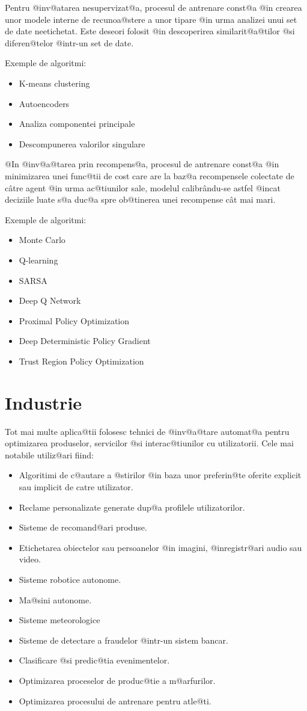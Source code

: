 Pentru @inv@atarea nesupervizat@a, procesul de antrenare const@a @in crearea unor modele interne de recunoa@stere a unor tipare @in urma analizei unui set de date neetichetat. Este deseori folosit @in descoperirea similarit@a@tilor @si diferen@telor @intr-un set de date.

Exemple de algoritmi:
\begin{itemize}
	\item K-means clustering
	\item Autoencoders
	\item Analiza componentei principale
	\item Descompunerea valorilor singulare
\end{itemize}

@In @inv@a@tarea prin recompens@a, procesul de antrenare const@a @in minimizarea unei func@tii de cost care are la baz@a recompensele colectate de c\^ atre agent @in urma ac@tiunilor sale, modelul calibr\^ andu-se astfel @incat deciziile luate s@a duc@a spre ob@tinerea unei recompense c\^ at mai mari.

Exemple de algoritmi:
\begin{itemize}
	\item Monte Carlo
	\item Q-learning
	\item SARSA
	\item Deep Q Network
	\item Proximal Policy Optimization
	\item Deep Deterministic Policy Gradient
	\item Trust Region Policy Optimization
\end{itemize}

\section{Industrie}

	Tot mai multe aplica@tii folosesc tehnici de @inv@a@tare automat@a pentru optimizarea produselor, servicilor @si interac@tiunilor cu utilizatorii. Cele mai notabile utiliz@ari fiind:
\begin{itemize}
	\item Algoritimi de c@autare a @stirilor @in baza unor preferin@te oferite explicit sau implicit de catre utilizator.
	\item Reclame personalizate generate dup@a profilele utilizatorilor.
	\item Sisteme de recomand@ari produse.
	\item Etichetarea obiectelor sau persoanelor @in imagini, @inregistr@ari audio sau video.
	\item Sisteme robotice autonome.
	\item Ma@sini autonome.
	\item Sisteme meteorologice
	\item Sisteme de detectare a fraudelor @intr-un sistem bancar.
	\item Clasificare @si predic@tia evenimentelor. 
	\item Optimizarea proceselor de produc@tie a m@arfurilor.
	\item Optimizarea procesului de antrenare pentru atle@ti.
\end{itemize}

